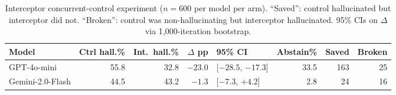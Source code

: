 \begin{table}[t]
\centering
\caption{Interceptor concurrent-control experiment ($n{=}600$ per model per arm). ``Saved'': control hallucinated but interceptor did not. ``Broken'': control was non-hallucinating but interceptor hallucinated. 95\% CIs on $\Delta$ via 1{,}000-iteration bootstrap.}
\label{tab:interceptor}
\small
\begin{tabular}{l r r r l r r r}
\toprule
Model & Ctrl hall.\% & Int.\ hall.\% & $\Delta$ pp & 95\% CI & Abstain\% & Saved & Broken \\
\midrule
GPT-4o-mini & 55.8 & 32.8 & $-23.0$ & [$-28.5$, $-17.3$] & 33.5 & 163 & 25 \\
Gemini-2.0-Flash & 44.5 & 43.2 & $-1.3$ & [$-7.3$, $+4.2$] & 2.8 & 24 & 16 \\
\bottomrule
\end{tabular}
\end{table}
